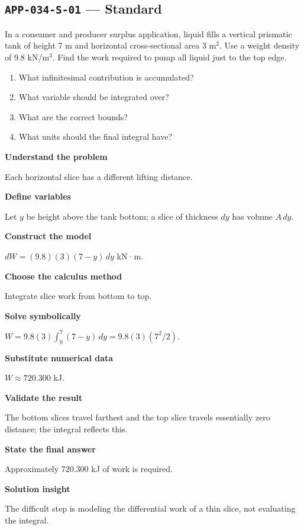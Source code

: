 \documentclass[11pt]{book}
\newcommand{\pid}[1]{\texttt{#1}}
\begin{document}
\subsection*{\pid{APP-034-S-01} — Standard}
\begin{problembox}
In a consumer and producer surplus application, liquid fills a vertical prismatic tank of height 7 m and horizontal cross-sectional area 3 m$^2$. Use a weight density of 9.8 kN/m$^3$. Find the work required to pump all liquid just to the top edge.
\end{problembox}
\begin{promptbox}\begin{enumerate}
\item What infinitesimal contribution is accumulated?
\item What variable should be integrated over?
\item What are the correct bounds?
\item What units should the final integral have?
\end{enumerate}\end{promptbox}
\begin{solutionbox}
\textbf{Understand the problem}\par Each horizontal slice has a different lifting distance.\par\medskip
\textbf{Define variables}\par Let $y$ be height above the tank bottom; a slice of thickness $dy$ has volume $A\,dy$.\par\medskip
\textbf{Construct the model}\par $dW=(9.8)(3)(7-y)\,dy$ kN·m.\par\medskip
\textbf{Choose the calculus method}\par Integrate slice work from bottom to top.\par\medskip
\textbf{Solve symbolically}\par $W=9.8(3)\int_0^{7}(7-y)\,dy=9.8(3)(7^2/2)$.\par\medskip
\textbf{Substitute numerical data}\par $W\approx 720.300$ kJ.\par\medskip
\textbf{Validate the result}\par The bottom slices travel farthest and the top slice travels essentially zero distance; the integral reflects this.\par\medskip
\textbf{State the final answer}\par Approximately $720.300$ kJ of work is required.\par\medskip
\textbf{Solution insight}\par The difficult step is modeling the differential work of a thin slice, not evaluating the integral.\par\medskip
\end{solutionbox}
\end{document}
